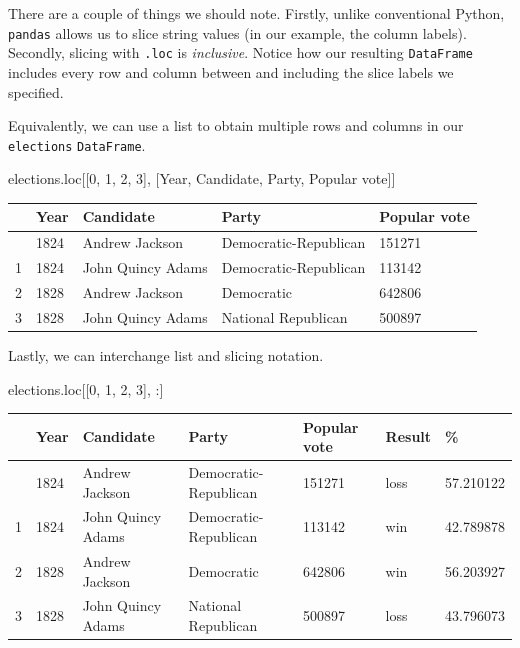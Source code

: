 \documentclass[
  letterpaper,
  DIV=11,
  numbers=noendperiod]{scrreprt}
\newenvironment{Shaded}{\begin{snugshade}}{\end{snugshade}}
\newcommand{\DecValTok}[1]{\textcolor[rgb]{0.68,0.00,0.00}{#1}}
\newcommand{\NormalTok}[1]{\textcolor[rgb]{0.00,0.23,0.31}{#1}}
\newcommand{\StringTok}[1]{\textcolor[rgb]{0.13,0.47,0.30}{#1}}
\begin{document}
There are a couple of things we should note. Firstly, unlike
conventional Python, \texttt{pandas} allows us to slice string values
(in our example, the column labels). Secondly, slicing with
\texttt{.loc} is \emph{inclusive}. Notice how our resulting
\texttt{DataFrame} includes every row and column between and including
the slice labels we specified.

Equivalently, we can use a list to obtain multiple rows and columns in
our \texttt{elections} \texttt{DataFrame}.

\begin{Shaded}
\begin{Highlighting}[]
\NormalTok{elections.loc[[}\DecValTok{0}\NormalTok{, }\DecValTok{1}\NormalTok{, }\DecValTok{2}\NormalTok{, }\DecValTok{3}\NormalTok{], [}\StringTok{\textquotesingle{}Year\textquotesingle{}}\NormalTok{, }\StringTok{\textquotesingle{}Candidate\textquotesingle{}}\NormalTok{, }\StringTok{\textquotesingle{}Party\textquotesingle{}}\NormalTok{, }\StringTok{\textquotesingle{}Popular vote\textquotesingle{}}\NormalTok{]]}
\end{Highlighting}
\end{Shaded}

\begin{longtable}[]{@{}lllll@{}}
\toprule\noalign{}
& Year & Candidate & Party & Popular vote \\
\midrule\noalign{}
\endhead
\bottomrule\noalign{}
\endlastfoot
0 & 1824 & Andrew Jackson & Democratic-Republican & 151271 \\
1 & 1824 & John Quincy Adams & Democratic-Republican & 113142 \\
2 & 1828 & Andrew Jackson & Democratic & 642806 \\
3 & 1828 & John Quincy Adams & National Republican & 500897 \\
\end{longtable}

Lastly, we can interchange list and slicing notation.

\begin{Shaded}
\begin{Highlighting}[]
\NormalTok{elections.loc[[}\DecValTok{0}\NormalTok{, }\DecValTok{1}\NormalTok{, }\DecValTok{2}\NormalTok{, }\DecValTok{3}\NormalTok{], :]}
\end{Highlighting}
\end{Shaded}

\begin{longtable}[]{@{}lllllll@{}}
\toprule\noalign{}
& Year & Candidate & Party & Popular vote & Result & \% \\
\midrule\noalign{}
\endhead
\bottomrule\noalign{}
\endlastfoot
0 & 1824 & Andrew Jackson & Democratic-Republican & 151271 & loss &
57.210122 \\
1 & 1824 & John Quincy Adams & Democratic-Republican & 113142 & win &
42.789878 \\
2 & 1828 & Andrew Jackson & Democratic & 642806 & win & 56.203927 \\
3 & 1828 & John Quincy Adams & National Republican & 500897 & loss &
43.796073 \\
\end{longtable}
\end{document}
